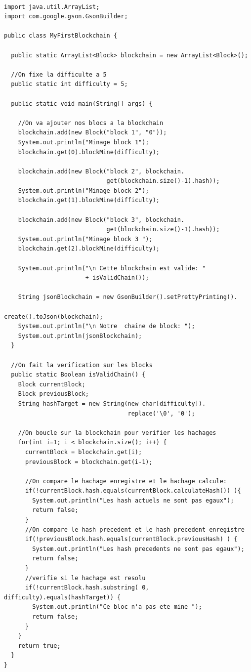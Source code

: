 \documentclass[12pt]{report}
\begin{document}
\begin{lstlisting}

import java.util.ArrayList;
import com.google.gson.GsonBuilder;

public class MyFirstBlockchain {
	
  public static ArrayList<Block> blockchain = new ArrayList<Block>();
  
  //On fixe la difficulte a 5
  public static int difficulty = 5;

  public static void main(String[] args) {	
    
    //On va ajouter nos blocs a la blockchain	
    blockchain.add(new Block("block 1", "0"));
    System.out.println("Minage block 1");
    blockchain.get(0).blockMine(difficulty);
		
    blockchain.add(new Block("block 2", blockchain.
                             get(blockchain.size()-1).hash));
    System.out.println("Minage block 2");
    blockchain.get(1).blockMine(difficulty);
		
    blockchain.add(new Block("block 3", blockchain.
                             get(blockchain.size()-1).hash));
    System.out.println("Minage block 3 ");
    blockchain.get(2).blockMine(difficulty);	
		
    System.out.println("\n Cette blockchain est valide: " 
                       + isValidChain());
		
    String jsonBlockchain = new GsonBuilder().setPrettyPrinting().
                                            create().toJson(blockchain);
    System.out.println("\n Notre  chaine de block: ");
    System.out.println(jsonBlockchain);
  }

  //On fait la verification	sur les blocks
  public static Boolean isValidChain() {
    Block currentBlock; 
    Block previousBlock;
    String hashTarget = new String(new char[difficulty]).
                                   replace('\0', '0');
		
    //On boucle sur la blockchain pour verifier les hachages
    for(int i=1; i < blockchain.size(); i++) {
      currentBlock = blockchain.get(i);
      previousBlock = blockchain.get(i-1);
      
      //On compare le hachage enregistre et le hachage calcule:
      if(!currentBlock.hash.equals(currentBlock.calculateHash()) ){
        System.out.println("Les hash actuels ne sont pas egaux");			
        return false;
      }
      //On compare le hash precedent et le hash precedent enregistre
      if(!previousBlock.hash.equals(currentBlock.previousHash) ) {
        System.out.println("Les hash precedents ne sont pas egaux");
        return false;
      }
      //verifie si le hachage est resolu
      if(!currentBlock.hash.substring( 0, difficulty).equals(hashTarget)) {
        System.out.println("Ce bloc n'a pas ete mine ");
        return false;
      }
    }
    return true;
  }
}

\end{lstlisting}
\end{document}
